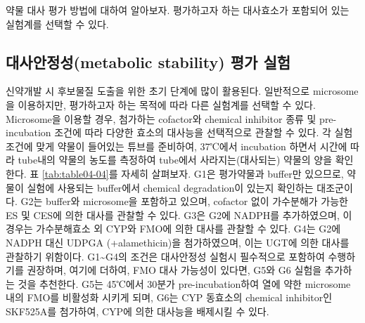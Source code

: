 \documentclass[
  11pt,
  krantz2, a4paper, twoside]{krantz}
\begin{document}
약물 대사 평가 방법에 대하여 알아보자. 평가하고자 하는 대사효소가
포함되어 있는 실험계를 선택할 수 있다.

\hypertarget{uxb300uxc0acuxc548uxc815uxc131metabolic-stability-uxd3c9uxac00-uxc2e4uxd5d8}{%
\subsection{대사안정성(metabolic stability) 평가 실험}\label{uxb300uxc0acuxc548uxc815uxc131metabolic-stability-uxd3c9uxac00-uxc2e4uxd5d8}}

신약개발 시 후보물질 도출을 위한 초기 단계에 많이 활용된다. 일반적으로
microsome을 이용하지만, 평가하고자 하는 목적에 따라 다른 실험계를 선택할
수 있다. Microsome을 이용할 경우, 첨가하는 cofactor와 chemical inhibitor
종류 및 pre-incubation 조건에 따라 다양한 효소의 대사능을 선택적으로
관찰할 수 있다. 각 실험 조건에 맞게 약물이 들어있는 튜브를 준비하여,
37℃에서 incubation 하면서 시간에 따라 tube내의 약물의 농도를 측정하여
tube에서 사라지는(대사되는) 약물의 양을 확인한다. 표 \ref{tab:table04-04}를 자세히
살펴보자. G1은 평가약물과 buffer만 있으므로, 약물이 실험에 사용되는
buffer에서 chemical degradation이 있는지 확인하는 대조군이다. G2는
buffer와 microsome을 포함하고 있으며, cofactor 없이 가수분해가 가능한 ES
및 CES에 의한 대사를 관찰할 수 있다. G3은 G2에 NADPH를 추가하였으며, 이
경우는 가수분해효소 외 CYP와 FMO에 의한 대사를 관찰할 수 있다. G4는 G2에
NADPH 대신 UDPGA (+alamethicin)을 첨가하였으며, 이는 UGT에 의한 대사를
관찰하기 위함이다. G1\textasciitilde G4의 조건은 대사안정성 실험시 필수적으로 포함하여
수행하기를 권장하며, 여기에 더하여, FMO 대사 가능성이 있다면, G5와 G6
실험을 추가하는 것을 추천한다. G5는 45℃에서 30분가 pre-incubation하여
열에 약한 microsome 내의 FMO를 비활성화 시키게 되며, G6는 CYP 동효소의
chemical inhibitor인 SKF525A를 첨가하여, CYP에 의한 대사능을 배제시킬 수
있다.
\end{document}
